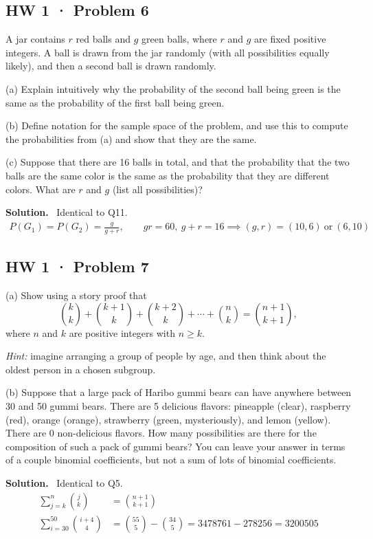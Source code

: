 \documentclass[11pt]{article}
\newcommand{\Sol}{\vspace{2pt}\noindent\textbf{Solution.}\ }
\begin{document}
\subsection{HW 1 · Problem 6}
\begin{qbox}
A jar contains $r$ red balls and $g$ green balls, where $r$ and $g$ are fixed positive integers. A ball is drawn from the jar randomly (with all possibilities equally likely), and then a second ball is drawn randomly.

(a) Explain intuitively why the probability of the second ball being green is the same as the probability of the first ball being green.

(b) Define notation for the sample space of the problem, and use this to compute the probabilities from (a) and show that they are the same.

(c) Suppose that there are 16 balls in total, and that the probability that the two balls are the same color is the same as the probability that they are different colors. What are $r$ and $g$ (list all possibilities)?
\end{qbox}
\Sol
Identical to Q11.
\begin{align*}
P(G_1) = P(G_2) = \frac{g}{g+r}, \qquad gr = 60,\ g+r=16 \implies (g,r) = (10,6)\ \text{or}\ (6,10)
\end{align*}

\subsection{HW 1 · Problem 7}
\begin{qbox}
(a) Show using a story proof that
\[
\binom{k}{k}+\binom{k+1}{k}+\binom{k+2}{k}+\cdots+\binom{n}{k}=\binom{n+1}{k+1},
\]
where $n$ and $k$ are positive integers with $n\ge k$.

\emph{Hint:} imagine arranging a group of people by age, and then think about the oldest person in a chosen subgroup.

(b) Suppose that a large pack of Haribo gummi bears can have anywhere between 30 and 50 gummi bears. There are 5 delicious flavors: pineapple (clear), raspberry (red), orange (orange), strawberry (green, mysteriously), and lemon (yellow). There are 0 non-delicious flavors. How many possibilities are there for the composition of such a pack of gummi bears? You can leave your answer in terms of a couple binomial coefficients, but not a sum of lots of binomial coefficients.
\end{qbox}
\Sol
Identical to Q5.
\begin{align*}
\sum_{j=k}^n \binom{j}{k} &= \binom{n+1}{k+1}\\[4pt]
\sum_{i=30}^{50}\binom{i+4}{4} &= \binom{55}{5}-\binom{34}{5} = 3478761-278256 = 3200505
\end{align*}
\end{document}
